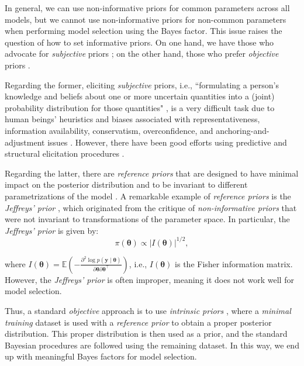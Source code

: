 In general, we can use non-informative priors for common parameters across all models, but we cannot use non-informative priors for non-common parameters when performing model selection using the Bayes factor. This issue raises the question of how to set informative priors. On one hand, we have those who advocate for \textit{subjective} priors \cite{Ramsey1926, deFinetti1937, savage1954, Lindley2000}; on the other hand, those who prefer \textit{objective} priors \cite{Bayes1763, Laplace1812, Jeffreys1961, Berger2006}. 

Regarding the former, eliciting \textit{subjective} priors, i.e., ``formulating a person's knowledge and beliefs about one or more uncertain quantities into a (joint) probability distribution for those quantities" \cite{garthwaite05}, is a very difficult task due to human beings' heuristics and biases associated with representativeness, information availability, conservatism, overconfidence, and anchoring-and-adjustment issues \cite{tversky74}. However, there have been good efforts using predictive and structural elicitation procedures \cite{Kadane80, kadane98}. 

Regarding the latter, there are \textit{reference priors} that are designed to have minimal impact on the posterior distribution and to be invariant to different parametrizations of the model \cite[Chap.~5]{bernardo2009bayesian}. A remarkable example of \textit{reference priors} is the \textit{Jeffreys' prior} \cite{jeffreys1946invariant}, which originated from the critique of \textit{non-informative priors} that were not invariant to transformations of the parameter space. In particular, the \textit{Jeffreys' prior} is given by:
\[
\pi(\bm{\theta}) \propto |I(\bm{\theta})|^{1/2},
\]

where \( I(\bm{\theta}) = \mathbb{E}\left(-\frac{\partial^2 \log p(\bm{y} \mid \bm{\theta})}{\partial \bm{\theta} \partial \bm{\theta}^{\top}}\right) \), i.e., \( I(\bm{\theta}) \) is the Fisher information matrix. However, the \textit{Jeffreys' prior} is often improper, meaning it does not work well for model selection. 

Thus, a standard \textit{objective} approach is to use \textit{intrinsic priors} \cite{berger1996intrinsic}, where a \textit{minimal training} dataset is used with a \textit{reference prior} to obtain a proper posterior distribution. This proper distribution is then used as a prior, and the standard Bayesian procedures are followed using the remaining dataset. In this way, we end up with meaningful Bayes factors for model selection.

